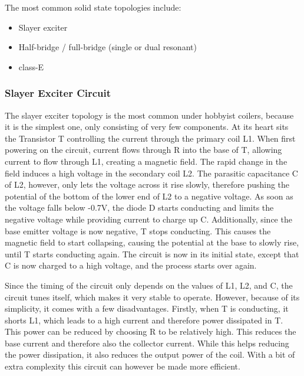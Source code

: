The most common solid state topologies include:
\begin{itemize}
\item Slayer exciter
\item Half-bridge / full-bridge (single or dual resonant)
\item class-E
\end{itemize}

\subsubsection{Slayer Exciter Circuit}

The slayer exciter topology is the most common under hobbyist coilers, because it is the simplest one, only consisting of very few components. At its heart sits the Transistor T controlling the current through the primary coil L1. When first powering on the circuit, current flows through R into the base of T, allowing current to flow through L1, creating a magnetic field. The rapid change in the field induces a high voltage in the secondary coil L2. The parasitic capacitance C of L2, however, only lets the voltage across it rise slowly, therefore pushing the potential of the bottom of the lower end of L2 to a negative voltage. As soon as the voltage falls below -0.7V, the diode D starts conducting and limits the negative voltage while providing current to charge up C. Additionally, since the base emitter voltage is now negative, T stops conducting. This causes the magnetic field to start collapsing, causing the potential at the base to slowly rise, until T starts conducting again. The circuit is now in its initial state, except that C is now charged to a high voltage, and the process starts over again.

Since the timing of the circuit only depends on the values of L1, L2, and C, the circuit tunes itself, which makes it very stable to operate. However, because of its simplicity, it comes with a few disadvantages. Firstly, when T is conducting, it shorts L1, which leads to a high current and therefore power dissipated in T. This power can be reduced by choosing R to be relatively high. This reduces the base current and therefore also the collector current. While this helps reducing the power dissipation, it also reduces the output power of the coil. With a bit of extra complexity this circuit can however be made more efficient.

